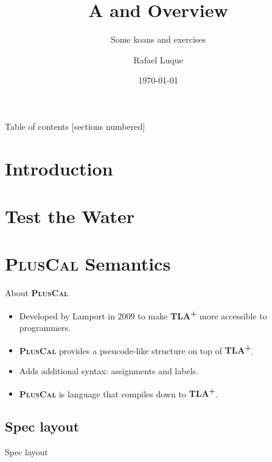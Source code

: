 \documentclass[10pt]{beamer}
\title{A \tlaplus and \pluscal Overview}
\subtitle{Some koans and exercises}
\date{\today}
\author{Rafael Luque}
\institute{OSOCO}
\newcommand{\tlaplus}{\textbf{\textsc{TLA\textsuperscript{+}}}\xspace}
\newcommand{\pluscal}{\textbf{\textsc{PlusCal}}\xspace}
\begin{document}
\maketitle

\begin{frame}{Table of contents}
  [sections numbered]
  \tableofcontents[hideallsubsections]
\end{frame}

\section{Introduction}

\section{Test the Water}

\section{\pluscal Semantics}

\begin{frame}{About \pluscal}
  \begin{itemize}
    \item Developed by Lamport in 2009 to make \tlaplus more accessible to programmers.
    \item \pluscal provides a pseucode-like structure on top of \tlaplus.
    \item Adds additional syntax: \alert{assignments} and \alert{labels}.
    \item \pluscal is language that compiles down to \tlaplus.
  \end{itemize}
\end{frame}

\subsection{Spec layout}

\begin{frame}{Spec layout}
  \layoutSample
\end{frame}
\end{document}

